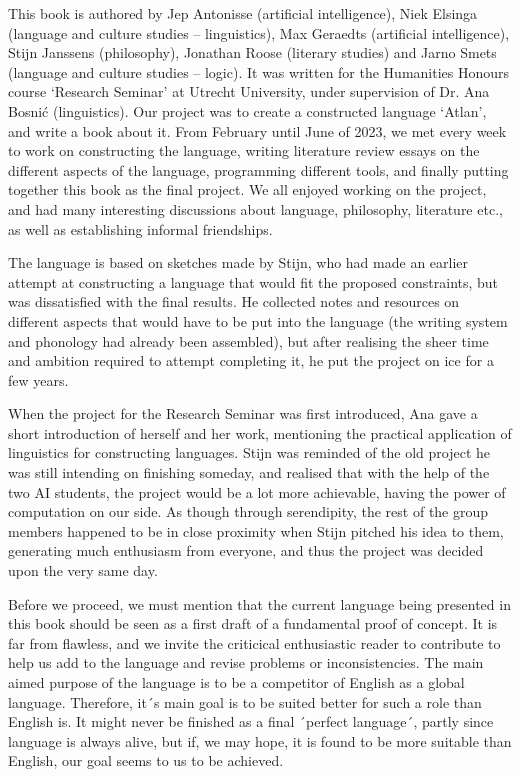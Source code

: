 This book is authored by Jep Antonisse (artificial intelligence), Niek Elsinga (language and culture studies – linguistics), Max Geraedts (artificial intelligence), Stijn Janssens (philosophy), Jonathan Roose (literary studies) and Jarno Smets (language and culture studies – logic). It was written for the Humanities Honours course ‘Research Seminar’ at Utrecht University, under supervision of Dr. Ana Bosnić (linguistics). Our project was to create a constructed language ‘Atlan’, and write a book about it. From February until June of 2023, we met every week to work on constructing the language, writing literature review essays on the different aspects of the language, programming different tools, and finally putting together this book as the final project. We all enjoyed working on the project, and had many interesting discussions about language, philosophy, literature etc., as well as establishing informal friendships. 

The language is based on sketches made by Stijn, who had made an earlier attempt at constructing a language that would fit the proposed constraints, but was dissatisfied with the final results. He collected notes and resources on different aspects that would have to be put into the language (the writing system and phonology had already been assembled), but after realising the sheer time and ambition required to attempt completing it, he put the project on ice for a few years.  

When the project for the Research Seminar was first introduced, Ana gave a short introduction of herself and her work, mentioning the practical application of linguistics for constructing languages. Stijn was reminded of the old project he was still intending on finishing someday, and realised that with the help of the two AI students, the project would be a lot more achievable, having the power of computation on our side. As though through serendipity, the rest of the group members happened to be in close proximity when Stijn pitched his idea to them, generating much enthusiasm from everyone, and thus the project was decided upon the very same day.  

Before
we proceed, we must mention that the current language being presented in this
book should be seen as a first draft of a fundamental proof of concept. It is
far from flawless, and we invite the criticical enthusiastic reader to
contribute to help us add to the language and revise problems or
inconsistencies. The main aimed purpose of the language is to be a competitor
of English as a global language. Therefore, it´s main goal is to be suited
better for such a role than English is. It might never be finished as a final ´perfect
language´, partly since language is always alive, but if, we may hope, it is
found  to be more suitable than English, our goal seems to us to be achieved.

